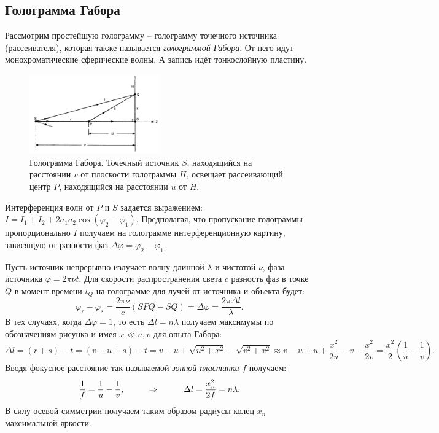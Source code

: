 \subsection{Голограмма Габора}
Рассмотрим простейшую голограмму -- голограмму точечного источника (рассеивателя), которая также называется \textit{голограммой Габора}. От него идут монохроматические сферические волны. А запись идёт тонкослойную пластину.
\begin{figure}
     \centering
     \includegraphics[width=0.5\textwidth]{figures/gabor_point.png}
     \caption{Голограмма Габора. Точечный источник $S$, находящийся на расстоянии $v$ от плоскости голограммы $H$, освещает рассеивающий центр $P$, находящийся на расстоянии $u$ от $H$. 
	}
 \end{figure}
Интерференция волн от $P$ и $S$ задается выражением: $I = I_1 + I_2 + 2 a_1 a_2 \cos (\varphi_2 - \varphi_1)$. Предполагая, что пропускание голограммы пропорционально $I$ получаем на голограмме интерференционную картину, зависящую от разности фаз $\Delta \varphi = \varphi_2 - \varphi_1$.

Пусть источник непрерывно излучает волну длинной $\lambda$ и чистотой $\nu$, фаза источника $\varphi = 2 \pi \nu t$.
Для скорости распространения света $c$ разность фаз в точке $Q$ в момент времени $t_Q$ на голограмме для лучей от источника и объекта будет:
\begin{equation*}
	\varphi_r - \varphi_s = \frac{2 \pi \nu}{c} (SPQ - SQ) = \Delta \varphi = \frac{2 \pi \Delta l}{\lambda}.
\end{equation*}
В тех случаях, когда $\Delta \varphi = 1$, то есть $\Delta l = n \lambda$ получаем максимумы по обозначениям рисунка и имея $x \ll u,v$ для опыта Габора:
\begin{equation*}
	\Delta l = (r+s) - t = (v - u + s) - t = v - u + \sqrt{u^2 + x^2} - \sqrt{v^2 + x^2} \approx v - u + u + \frac{x^2}{2 u} - v - \frac{x^2}{2 v} = \frac{x^2}{2}\left(\frac{1}{u} - \frac{1}{v}\right).
\end{equation*}
Вводя фокусное расстояние так называемой \textit{зонной пластинки} $f$ получаем:
\begin{equation*}
 	\frac{1}{f} = \frac{1}{u} - \frac{1}{v},
 	\hspace{1 cm}
 	\Rightarrow
 	\hspace{1 cm}
 	\Delta l = \frac{x_n^2}{2 f} = n \lambda.
 \end{equation*} 
 В силу осевой симметрии получаем таким образом радиусы колец $x_n$ максимальной яркости.

